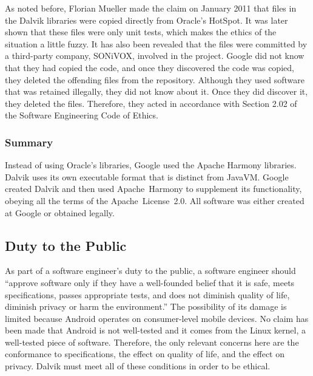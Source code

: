 \documentclass[11pt]{article}
\begin{document}
\begin{multicols}{2}
As noted before, Florian Mueller made the claim on January 2011 that files in
the Dalvik libraries were copied directly from Oracle's HotSpot.  It was later
shown that these files were only unit tests, which makes the ethics of the
situation a little fuzzy.  It has also been revealed that the files were
committed by a third-party company, SONiVOX, involved in the project.  Google
did not know that they had copied the code, and once they discovered the code
was copied, they deleted the offending files from the repository.  Although they
used software that was retained illegally, they did not know about it.  Once
they did discover it, they deleted the files.  Therefore, they acted in
accordance with Section 2.02 of the Software Engineering Code of Ethics.


\subsubsection{Summary} %
\label{ssub:licensing-summary}

Instead of using Oracle's libraries, Google used the Apache Harmony libraries.
Dalvik uses its own executable format that is distinct from JavaVM.  Google
created Dalvik and then used Apache~Harmony to supplement its functionality,
obeying all the terms of the Apache~License~2.0.  All software was either
created at Google or obtained legally.



\subsection{Duty to the Public} %
\label{sub:public}

As part of a software engineer's duty to the public, a software engineer should
``approve software only if they have a well-founded belief that it is safe,
meets specifications, passes appropriate tests, and does not diminish quality of
life, diminish privacy or harm the environment.'' \cite[\S~1.03]{secode}  The
possibility of its damage is limited because Android operates on consumer-level
mobile devices.  No claim has been made that Android is not well-tested and it
comes from the Linux kernel, a well-tested piece of software.  Therefore, the
only relevant concerns here are the conformance to specifications, the effect on
quality of life, and the effect on privacy.  Dalvik must meet all of these
conditions in order to be ethical.


\end{multicols}
\end{document}

